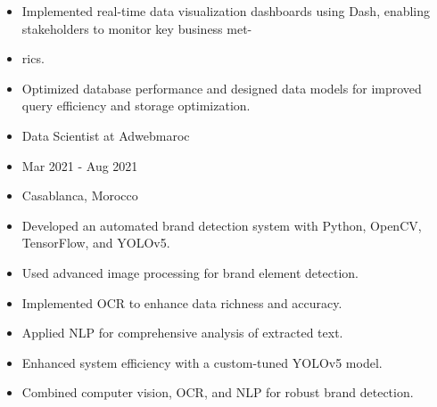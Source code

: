 \documentclass[10pt,a4paper,ragged2e,withhyper]{altacv}
\begin{document}
\begin{itemize}[noitemsep]
\item Implemented real-time data visualization dashboards using Dash, enabling stakeholders to monitor key business met-
\item rics.
\item Optimized database performance and designed data models for improved query efficiency and storage optimization.
\item Data Scientist at Adwebmaroc
\item Mar 2021 - Aug 2021
\item Casablanca, Morocco
\item Developed an automated brand detection system with Python, OpenCV, TensorFlow, and YOLOv5.
\item Used advanced image processing for brand element detection.
\item Implemented OCR to enhance data richness and accuracy.
\item Applied NLP for comprehensive analysis of extracted text.
\item Enhanced system efficiency with a custom-tuned YOLOv5 model.
\item Combined computer vision, OCR, and NLP for robust brand detection.
\end{itemize}
\end{document}
